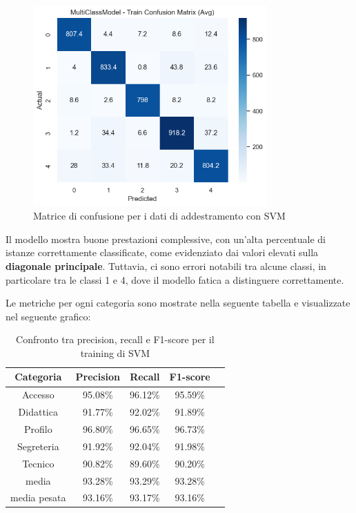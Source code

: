 \begin{figure}[H]
    \centering
    \includegraphics[width=0.8\textwidth]{images/confusion_matrix_train_svm.png}
    \caption{Matrice di confusione per i dati di addestramento con SVM}
    \label{fig:confusion_matrix_train_svm}
\end{figure}

Il modello mostra buone prestazioni complessive, con un’alta percentuale di istanze correttamente classificate, come evidenziato dai valori elevati sulla \textbf{diagonale principale}. Tuttavia, ci sono errori notabili tra alcune classi, in particolare tra le classi 1 e 4, dove il modello fatica a distinguere correttamente.

\newpage

Le metriche per ogni categoria sono mostrate nella seguente tabella e visualizzate nel seguente grafico:

\begin{table}[H]
    \centering
    \begin{tabular}{|c|c|c|c|c|}
        \hline
        \textbf{Categoria} & \textbf{Precision} & \textbf{Recall} & \textbf{F1-score} \\
        \hline
        Accesso & 95.08\% & 96.12\% & 95.59\% \\
        \hline
        Didattica & 91.77\% & 92.02\% & 91.89\% \\
        \hline
        Profilo & 96.80\% & 96.65\% & 96.73\% \\
        \hline
        Segreteria & 91.92\% & 92.04\% & 91.98\% \\
        \hline
        Tecnico & 90.82\% & 89.60\% & 90.20\% \\
        \hline
        media & 93.28\% & 93.29\% & 93.28\% \\
        \hline
        media pesata & 93.16\% & 93.17\% & 93.16\% \\
        \hline
    \end{tabular}
    \caption{Confronto tra precision, recall e F1-score per il training di SVM}
    \label{tab:metriche_svm_train}
\end{table}

